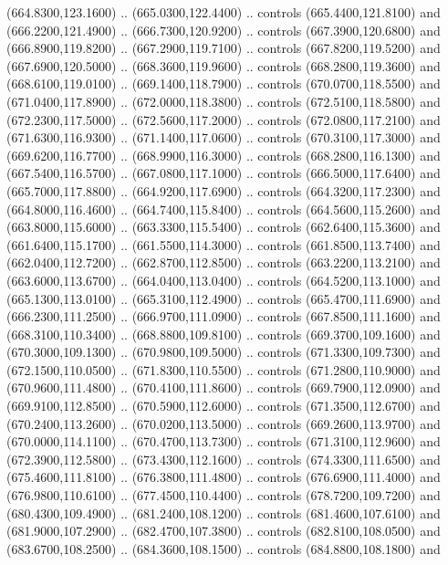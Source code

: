 {\begin{scope}[y=0.80pt, x=0.80pt, yscale=-1, xscale=1, inner sep=0pt, outer sep=0pt, #1]
      (664.8300,123.1600) .. (665.0300,122.4400) .. controls (665.4400,121.8100) and
      (666.2200,121.4900) .. (666.7300,120.9200) .. controls (667.3900,120.6800) and
      (666.8900,119.8200) .. (667.2900,119.7100) .. controls (667.8200,119.5200) and
      (667.6900,120.5000) .. (668.3600,119.9600) .. controls (668.2800,119.3600) and
      (668.6100,119.0100) .. (669.1400,118.7900) .. controls (670.0700,118.5500) and
      (671.0400,117.8900) .. (672.0000,118.3800) .. controls (672.5100,118.5800) and
      (672.2300,117.5000) .. (672.5600,117.2000) .. controls (672.0800,117.2100) and
      (671.6300,116.9300) .. (671.1400,117.0600) .. controls (670.3100,117.3000) and
      (669.6200,116.7700) .. (668.9900,116.3000) .. controls (668.2800,116.1300) and
      (667.5400,116.5700) .. (667.0800,117.1000) .. controls (666.5000,117.6400) and
      (665.7000,117.8800) .. (664.9200,117.6900) .. controls (664.3200,117.2300) and
      (664.8000,116.4600) .. (664.7400,115.8400) .. controls (664.5600,115.2600) and
      (663.8000,115.6000) .. (663.3300,115.5400) .. controls (662.6400,115.3600) and
      (661.6400,115.1700) .. (661.5500,114.3000) .. controls (661.8500,113.7400) and
      (662.0400,112.7200) .. (662.8700,112.8500) .. controls (663.2200,113.2100) and
      (663.6000,113.6700) .. (664.0400,113.0400) .. controls (664.5200,113.1000) and
      (665.1300,113.0100) .. (665.3100,112.4900) .. controls (665.4700,111.6900) and
      (666.2300,111.2500) .. (666.9700,111.0900) .. controls (667.8500,111.1600) and
      (668.3100,110.3400) .. (668.8800,109.8100) .. controls (669.3700,109.1600) and
      (670.3000,109.1300) .. (670.9800,109.5000) .. controls (671.3300,109.7300) and
      (672.1500,110.0500) .. (671.8300,110.5500) .. controls (671.2800,110.9000) and
      (670.9600,111.4800) .. (670.4100,111.8600) .. controls (669.7900,112.0900) and
      (669.9100,112.8500) .. (670.5900,112.6000) .. controls (671.3500,112.6700) and
      (670.2400,113.2600) .. (670.0200,113.5000) .. controls (669.2600,113.9700) and
      (670.0000,114.1100) .. (670.4700,113.7300) .. controls (671.3100,112.9600) and
      (672.3900,112.5800) .. (673.4300,112.1600) .. controls (674.3300,111.6500) and
      (675.4600,111.8100) .. (676.3800,111.4800) .. controls (676.6900,111.4000) and
      (676.9800,110.6100) .. (677.4500,110.4400) .. controls (678.7200,109.7200) and
      (680.4300,109.4900) .. (681.2400,108.1200) .. controls (681.4600,107.6100) and
      (681.9000,107.2900) .. (682.4700,107.3800) .. controls (682.8100,108.0500) and
      (683.6700,108.2500) .. (684.3600,108.1500) .. controls (684.8800,108.1800) and

\end{scope}}
